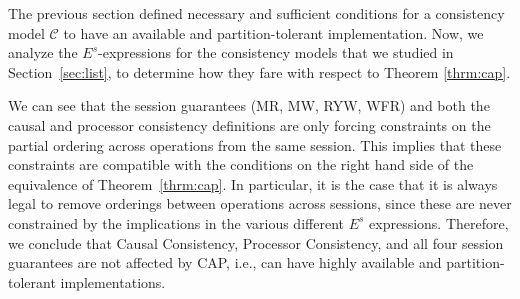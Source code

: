 \documentclass[journal,compsoc]{IEEEtran}
\begin{document}
The previous section defined necessary and sufficient conditions for 
a consistency model $\mathcal{C}$ to have an available and partition-tolerant
implementation. Now, we analyze the $E^s$-expressions for the consistency models that we studied in Section~\ref{sec:list}, to determine how they fare with respect to Theorem \ref{thrm:cap}.

We can see that the session guarantees (MR, MW, RYW, WFR) and both the causal and processor consistency definitions are only forcing constraints on the partial ordering across operations from the same session. This implies that these constraints are compatible with the conditions on the right hand side of the equivalence of Theorem~\ref{thrm:cap}. In particular, it is the case that it is always legal to remove orderings between operations across sessions, since these are never constrained by the implications in the various different $E^s$ expressions. Therefore, we conclude that Causal Consistency, Processor Consistency, and all four session guarantees are not affected by CAP, i.e., can have highly available and partition-tolerant implementations.
\end{document}
